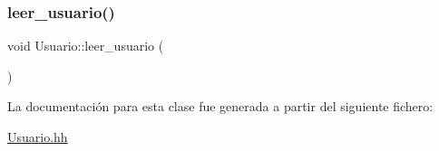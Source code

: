 \subsubsection{\texorpdfstring{leer\+\_\+usuario()}{leer\_usuario()}}
{\footnotesize\ttfamily void Usuario\+::leer\+\_\+usuario (\begin{DoxyParamCaption}{ }\end{DoxyParamCaption})}



La documentación para esta clase fue generada a partir del siguiente fichero\+:\begin{DoxyCompactItemize}
\item 
\mbox{\hyperlink{_usuario_8hh}{Usuario.\+hh}}\end{DoxyCompactItemize}

